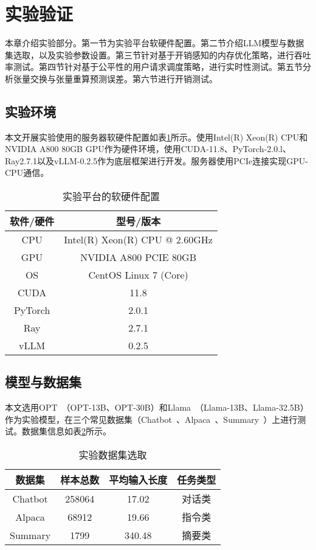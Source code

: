 \section{实验验证}

本章介绍实验部分。第一节为实验平台软硬件配置。第二节介绍LLM模型与数据集选取，以及实验参数设置。第三节针对基于开销感知的内存优化策略，进行吞吐率测试。第四节针对基于公平性的用户请求调度策略，进行实时性测试。第五节分析张量交换与张量重算预测误差。第六节进行开销测试。

\subsection{实验环境}

本文开展实验使用的服务器软硬件配置如表\ref{Table:实验平台的软硬件配置}所示。使用Intel(R) Xeon(R) CPU和NVIDIA A800 80GB GPU作为硬件环境，使用CUDA-11.8、PyTorch-2.0.l、Ray2.7.1以及vLLM-0.2.5作为底层框架进行开发。服务器使用PCIe连接实现GPU-CPU通信。

\begin{table}[H]
  \centering
  \caption{实验平台的软硬件配置}
  \label{Table:实验平台的软硬件配置}
  \renewcommand{\arraystretch}{1.25}
  \small
  \begin{tabular}{c c}
    \toprule
    \textbf{软件/硬件} & \textbf{型号/版本} \\ 
    \midrule
    CPU & Intel(R) Xeon(R) CPU @ 2.60GHz  \\ 
    GPU & NVIDIA A800 PCIE 80GB \\ 
    OS & CentOS Linux 7 (Core) \\ 
    CUDA & 11.8 \\ 
    PyTorch & 2.0.1 \\ 
    Ray & 2.7.1 \\
    vLLM & 0.2.5 \\ 
    \bottomrule
  \end{tabular}
\end{table}

\subsection{模型与数据集}

本文选用OPT~\cite{OPT}（OPT-13B、OPT-30B）和Llama~\cite{Llama}（Llama-13B、Llama-32.5B）作为实验模型，在三个常见数据集（Chatbot~\cite{Chatbot}、Alpaca~\cite{Alpaca}、Summary~\cite{Summary}）上进行测试。数据集信息如表\ref{Table:实验数据集选取}所示。

\begin{table}[H]
  \centering
  \caption{实验数据集选取}
  \label{Table:实验数据集选取}
  \renewcommand{\arraystretch}{1.25}
  \small
  \begin{tabular}{c c c c}
    \toprule
    \textbf{数据集} & \textbf{样本总数} & \textbf{平均输入长度} & \textbf{任务类型} \\
    \midrule
    Chatbot & 258064 & 17.02 & 对话类 \\
    Alpaca & 68912 & 19.66 & 指令类 \\
    Summary & 1799 & 340.48 & 摘要类 \\
    \bottomrule
  \end{tabular}
\end{table}

